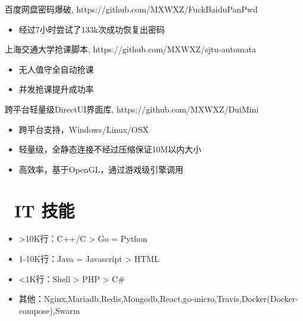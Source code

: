 \documentclass{resume}
\begin{document}
\begin{onehalfspacing}
    百度网盘密码爆破, https://github.com/MXWXZ/FuckBaiduPanPwd
    \begin{itemize}
        \item 经过7小时尝试了133k次成功恢复出密码
    \end{itemize}
\end{onehalfspacing}

\begin{onehalfspacing}
    上海交通大学抢课脚本, https://github.com/MXWXZ/sjtu-automata
    \begin{itemize}
        \item 无人值守全自动抢课
        \item 并发抢课提升成功率
    \end{itemize}
\end{onehalfspacing}

\begin{onehalfspacing}
    跨平台轻量级DirectUI界面库, https://github.com/MXWXZ/DuiMini
    \begin{itemize}
        \item 跨平台支持，Windows/Linux/OSX
        \item 轻量级，全静态连接不经过压缩保证10M以内大小
        \item 高效率，基于OpenGL，通过游戏级引擎调用
    \end{itemize}
\end{onehalfspacing}


\section{\faCogs\ IT 技能}
\begin{itemize}[parsep=0.5ex]
    \item >10K行：C++/C > Go = Python
    \item 1-10K行：Java = Javascript > HTML
    \item <1K行：Shell > PHP > C\#
    \item 其他：Nginx,Mariadb,Redis,Mongodb,React,go-micro,Travis,Docker(Docker-compose),Swarm
\end{itemize}
\end{document}
